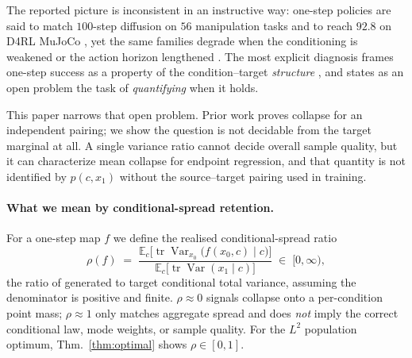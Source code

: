 \documentclass{article}
\theoremstyle{plain}
\newcommand{\tr}{\operatorname{tr}}
\newcommand{\Var}{\operatorname{Var}}
\newcommand{\Eop}{\mathbb{E}}
\begin{document}
The reported picture is inconsistent in an instructive way: one-step policies are said
to match $100$-step diffusion on $56$ manipulation tasks \citep{li2026ofp} and to
reach $92.8$ on D4RL MuJoCo \citep{nguyen2026bfq}, yet the same families degrade when
the conditioning is weakened or the action horizon lengthened
\citep{li2026ofp,letitbesimple2026}. The most explicit diagnosis frames one-step
success as a property of the condition--target \emph{structure}
\citep{letitbesimple2026}, and states as an open problem the task of \emph{quantifying}
when it holds.

This paper narrows that open problem. Prior work proves collapse for an independent
pairing; we show the question is not decidable from the target marginal at all. A single
variance ratio cannot decide overall sample quality, but it can characterize mean collapse
for endpoint regression, and that quantity is not identified by $p(c,x_1)$ without the
source--target pairing used in training.

\paragraph{What we mean by conditional-spread retention.}
For a one-step map $f$ we define the realised conditional-spread ratio
\begin{equation}
  \rho(f) \;=\;
  \frac{\Eop_c\big[\tr\Var_{x_0}\big(f(x_0,c)\mid c\big)\big]}
       {\Eop_c\big[\tr\Var(x_1\mid c)\big]} \;\in\;[0,\infty),
  \label{eq:rho}
\end{equation}
the ratio of generated to target conditional total variance, assuming the denominator is
positive and finite. $\rho\approx0$ signals collapse onto a per-condition point mass;
$\rho\approx1$ only matches aggregate spread and does \emph{not} imply the correct
conditional law, mode weights, or sample quality. For the $L^2$ population optimum,
Thm.~\ref{thm:optimal} shows $\rho\in[0,1]$.
\end{document}
